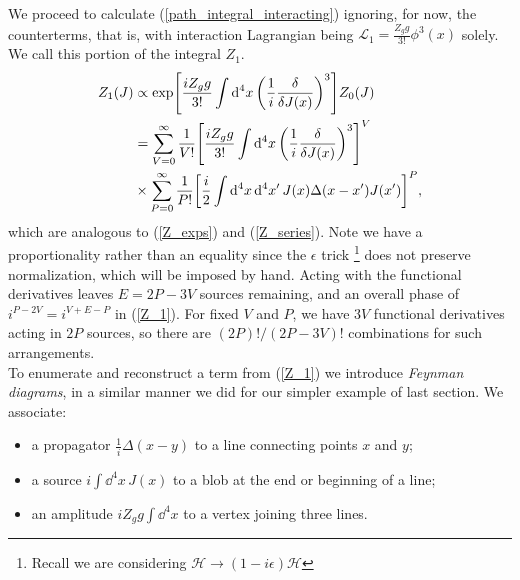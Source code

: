 We proceed to calculate (\ref{path_integral_interacting}) ignoring, for now, the counterterms, that is, with interaction Lagrangian being $\mathcal{L}_1=\frac{Z_gg}{3!}\phi^3(x)$ solely. We call this portion of the integral $Z_1$.
\begin{equation}
\begin{aligned}
      Z_1(J)&\propto\exp[\frac{iZ_gg}{3!}\int\dd^4x\,\qty(\frac{1}{i}\fdv{J(x)})^3]Z_0(J)\\
      &=\sum_{V=0}^\infty\frac{1}{V!}\qty[\frac{iZ_gg}{3!}\int\dd^4x\,\qty(\frac{1}{i}\fdv{J(x)})^3]^V\\&\times\sum_{P=0}^{\infty}\frac{1}{P!}\qty[\frac{i}{2}\int\dd^4x\,\dd^4x^\prime\,J(x)\Delta(x-x^\prime)J(x^\prime)]^P,
      \label{Z_1}
\end{aligned}
\end{equation}
which are analogous to (\ref{Z_exps}) and (\ref{Z_series}). Note we have a  proportionality rather than an equality since the $\epsilon$ trick \footnote{Recall we are considering $\mathcal{H}\to(1-i\epsilon)\mathcal{H}$} does not preserve normalization, which will be imposed by hand. Acting with the functional derivatives leaves $E=2P-3V$ sources remaining, and an overall phase of $i^{P-2V}=i^{V+E-P}$ in (\ref{Z_1}). For fixed $V$ and $P$, we have $3V$ functional derivatives acting in $2P$ sources, so there are $(2P)!/(2P-3V)!$ combinations for such arrangements. \\

To enumerate and reconstruct a term from (\ref{Z_1}) we introduce \textit{Feynman diagrams}, in a similar manner we did for our simpler example of last section. We associate:
\begin{itemize}
    \item a propagator $\frac{1}{i}\Delta(x-y)$ to a line connecting points $x$ and $y$;
    \item a source $i\int\dd^4 x\,J(x)$ to a blob at the end or beginning of a line;
    \item an amplitude $iZ_gg\int\dd^4x$ to a vertex joining three lines.
\end{itemize}

